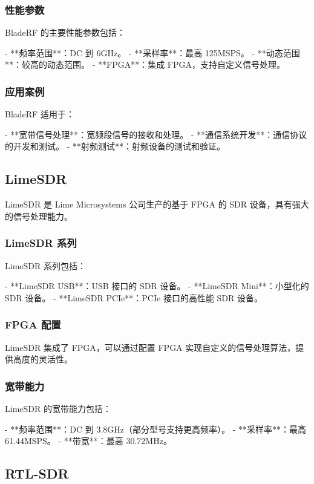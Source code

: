 \documentclass[UTF8]{ctexbook}
\begin{document}
\subsubsection{性能参数}

BladeRF 的主要性能参数包括：

- **频率范围**：DC 到 6GHz。
- **采样率**：最高 125MSPS。
- **动态范围**：较高的动态范围。
- **FPGA**：集成 FPGA，支持自定义信号处理。

\subsubsection{应用案例}

BladeRF 适用于：

- **宽带信号处理**：宽频段信号的接收和处理。
- **通信系统开发**：通信协议的开发和测试。
- **射频测试**：射频设备的测试和验证。

\subsection{LimeSDR}

LimeSDR 是 Lime Microsystems 公司生产的基于 FPGA 的 SDR 设备，具有强大的信号处理能力。

\subsubsection{LimeSDR 系列}

LimeSDR 系列包括：

- **LimeSDR USB**：USB 接口的 SDR 设备。
- **LimeSDR Mini**：小型化的 SDR 设备。
- **LimeSDR PCIe**：PCIe 接口的高性能 SDR 设备。

\subsubsection{FPGA 配置}

LimeSDR 集成了 FPGA，可以通过配置 FPGA 实现自定义的信号处理算法，提供高度的灵活性。

\subsubsection{宽带能力}

LimeSDR 的宽带能力包括：

- **频率范围**：DC 到 3.8GHz（部分型号支持更高频率）。
- **采样率**：最高 61.44MSPS。
- **带宽**：最高 30.72MHz。

\subsection{RTL-SDR}
\end{document}
